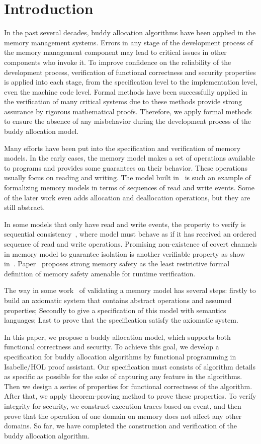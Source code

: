\documentclass[runningheads]{llncs}
\begin{document}
\section{Introduction}
In the past several decades, buddy allocation algorithms have been applied in the memory management systems. Errors in any stage of the development process of the memory management component may lead to critical issues in other components who invoke it. To improve confidence on the reliability of the development process, verification of functional correctness and security properties is applied into each stage, from the specification level to the implementation level, even the machine code level. Formal methods have been successfully applied in the verification of many critical systems due to these methods provide strong assurance by rigorous mathematical proofs. Therefore, we apply formal methods to ensure the absence of any misbehavior during the development process of the buddy allocation model.

Many efforts have been put into the specification and verification of memory models. In the early cases, the memory model makes a set of operations available to programs and provides some guarantees on their behavior. These operations usually focus on reading and writing. The model built in~\cite{reg_higham} is such an example of formalizing memory models in terms of sequences of read and write events. Some of the later work even adds allocation and deallocation operations, but they are still abstract. 

In some models that only have read and write events, the property to verify is sequential consistency~\cite{reg_higham}, where model must behave as if it has received an ordered sequence of read and write operations. Promising non-existence of covert channels in memory model to guarantee isolation is another verifiable property as show in~\cite{reg_peter}. Paper~\cite{reg_rosu} proposes strong memory safety as the least restrictive formal definition of memory safety amenable for runtime verification.

The way in some work~\cite{reg_blazy,reg_mansky} of validating a memory model has several steps: firstly to build an axiomatic system that contains abstract operations and assumed properties; Secondly to give a specification of this model with semantics languages; Last to prove that the specification satisfy the axiomatic system.

In this paper, we propose a buddy allocation model, which supports both functional correctness and security. To achieve this goal, we develop a specification for buddy allocation algorithms by functional programming in Isabelle/HOL proof assistant. Our specification must consists of algorithm details as specific as possible for the sake of capturing any feature in the algorithms. Then we design a series of properties for functional correctness of the algorithm. After that, we apply theorem-proving method to prove these properties. To verify integrity for security, we construct execution traces based on event, and then prove that the operation of one domain on memory does not affect any other domains. So far, we have completed the construction and verification of the buddy allocation algorithm.
\end{document}
